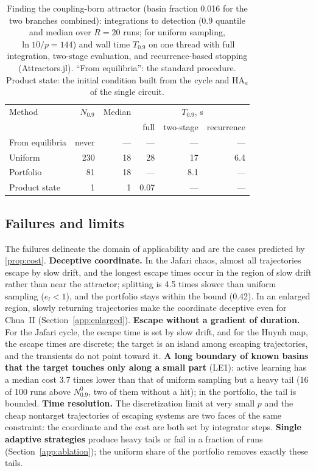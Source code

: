\begin{table}[tbhp]
\caption{Finding the coupling-born attractor (basin fraction 0.016 for the two branches combined): integrations to detection (0.9 quantile and median over $R=20$ runs; for uniform sampling, $\ln10/p=144$) and wall time $T_{0.9}$ on one thread with full integration, two-stage evaluation, and recurrence-based stopping (Attractors.jl). ``From equilibria'': the standard procedure. Product state: the initial condition built from the cycle and HA$_a$ of the single circuit.}
\label{tab:newattr}
\centering\scriptsize
\begin{tabular}{lrrrrr}
\toprule
Method & $N_{0.9}$ & Median & \multicolumn{3}{c}{$T_{0.9}$, s} \\
 & & & full & two-stage & recurrence \\
\midrule
From equilibria & never & --- & --- & --- & --- \\
Uniform & 230 & 18 & 28 & 17 & 6.4 \\
Portfolio & 81 & 18 & --- & 8.1 & --- \\
Product state & 1 & 1 & 0.07 & --- & --- \\
\bottomrule
\end{tabular}
\end{table}

\subsection{Failures and limits}\label{sec:failures}

The failures delineate the domain of applicability and are the cases predicted by \cref{prop:cost}.
\textbf{Deceptive coordinate.} In the Jafari chaos, almost all trajectories escape by slow drift, and the longest escape times occur in the region of slow drift rather than near the attractor; splitting is 4.5 times slower than uniform sampling ($e_l<1$), and the portfolio stays within the bound (0.42). In an enlarged region, slowly returning trajectories make the coordinate deceptive even for Chua~II (Section~\ref{app:enlarged}).
\textbf{Escape without a gradient of duration.} For the Jafari cycle, the escape time is set by slow drift, and for the Huynh map, the escape times are discrete; the target is an island among escaping trajectories, and the transients do not point toward it.
\textbf{A long boundary of known basins that the target touches only along a small part} (LE1): active learning has a median cost 3.7 times lower than that of uniform sampling but a heavy tail (16 of 100 runs above $N^0_{0.9}$, two of them without a hit); in the portfolio, the tail is bounded.
\textbf{Time resolution.} The discretization limit at very small $p$ and the cheap nontarget trajectories of escaping systems are two faces of the same constraint: the coordinate and the cost are both set by integrator steps.
\textbf{Single adaptive strategies} produce heavy tails or fail in a fraction of runs (Section~\ref{app:ablation}); the uniform share of the portfolio removes exactly these tails.
